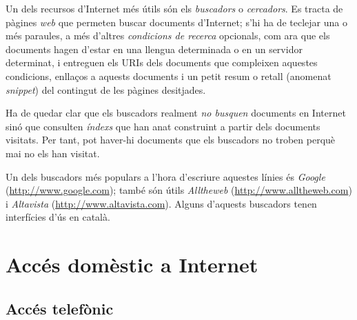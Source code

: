 Un dels recursos d'Internet més útils són els \emph{buscadors} o
\emph{cercadors}. Es tracta de pàgines \emph{web} que permeten buscar
documents d'Internet; s'hi ha de teclejar una o més paraules, a més
d'altres \emph{condicions de recerca} opcionals, com ara que els
documents hagen d'estar en una llengua determinada o en un servidor
determinat, i entreguen els URIs dels documents que compleixen
aquestes condicions, enllaços a aquests documents i un
petit resum o retall (anomenat \emph{snippet}) del contingut de les
pàgines desitjades.  

Ha de quedar clar que els buscadors realment \emph{no busquen}
documents en Internet sinó que consulten \emph{índexs} que han anat
construint a partir dels documents visitats. Per tant, pot haver-hi
documents que els buscadors no troben perquè mai no els han visitat.

Un dels buscadors més populars a l'hora d'escriure aquestes línies és
\emph{Google} (\url{http://www.google.com}); també són útils
\emph{Alltheweb} (\url{http://www.alltheweb.com}) i
\emph{Altavista} (\url{http://www.altavista.com}). Alguns
d'aquests buscadors tenen interfícies d'ús en català.


\section{Accés domèstic a Internet}
\label{ss:adaI}

\subsection{Accés telefònic}


